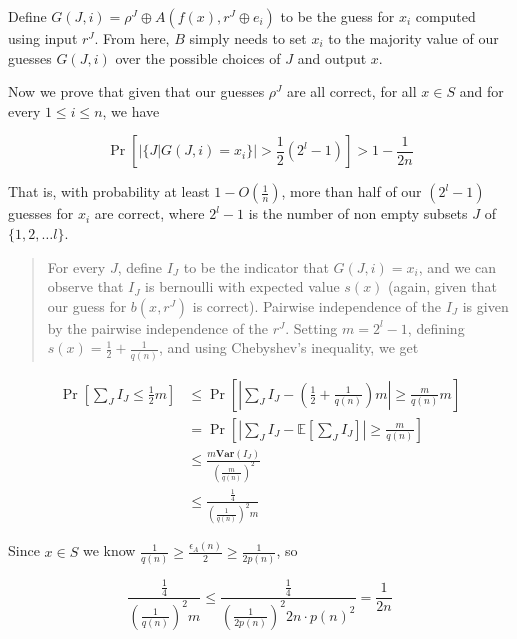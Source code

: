 Define \(G(J, i) = \rho^J \oplus A(f(x), r^J \oplus e_i)\) to be the
guess for \(x_i\) computed using input \(r^J\). From here, \(B\) simply
needs to set \(x_i\) to the majority value of our guesses \(G(J, i)\)
over the possible choices of \(J\) and output \(x\).

Now we prove that given that our guesses \(\rho^J\) are all correct, for
all \(x \in S\) and for every \(1 \leq i \leq n\), we have

\begin{equation*}
\Pr \left[ \left| \{ J | G(J, i) = x_i \} \right| > \frac{1}{2}(2^l - 1) \right] > 1 - \frac{1}{2n}
\end{equation*}

That is, with probability at least \(1 - O(\tfrac{1}{n})\), more than
half of our \((2^l - 1)\) guesses for \(x_i\) are correct, where
\(2^l - 1\) is the number of non empty subsets \(J\) of
\(\{1, 2, \dots l\}\).

\begin{quote}
For every \(J\), define \(I_J\) to be the indicator that
\(G(J, i) = x_i\), and we can observe that \(I_J\) is bernoulli with
expected value \(s(x)\) (again, given that our guess for \(b(x, r^J)\)
is correct). Pairwise independence of the \(I_J\) is given by the
pairwise independence of the \(r^J\). Setting \(m = 2^l - 1\), defining
\(s(x) = \tfrac{1}{2} + \tfrac{1}{q(n)}\), and using Chebyshev's
inequality, we get
\end{quote}

\begin{equation*}
\begin{aligned}
    \Pr \left[ \sum_{J}I_J \leq \frac{1}{2}m \right] &\leq \Pr \left[ \left| \sum_{J} I_J - \left(\frac{1}{2} + \frac{1}{q(n)} \right) m \right| \geq \frac{m}{q(n)}m \right] \\
    &= \Pr \left[ \left| \sum_{J} I_J - \mathbb{E} \left[ \sum_{J} I_J \right] \right| \geq \frac{m}{q(n)} \right] \\
    &\leq \frac{m \mathbf{Var}(I_J)}{\left(\frac{m}{q(n)}\right)^2} \\
    &\leq \frac{\frac{1}{4}}{\left( \frac{1}{q(n)} \right)^2 m}
\end{aligned}
\end{equation*}

Since \(x \in S\) we know
\(\frac{1}{q(n)} \geq \frac{\epsilon_A(n)}{2} \geq \frac{1}{2p(n)}\), so

\begin{equation*}
\frac{\frac{1}{4}}{\left( \frac{1}{q(n)} \right)^2 m} \leq \frac{\frac{1}{4}}{\left( \frac{1}{2p(n)} \right)^2 2n \cdot p(n)^2} = \frac{1}{2n}
\end{equation*}

